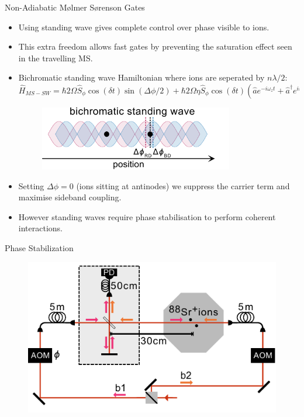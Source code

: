 \documentclass[final]{beamer}
\begin{document}
\begin{frame}{}
\begin{center}
\begin{columns}[t]
\begin{column}{0.49\textwidth}
\begin{alertblock}{Non-Adiabatic Mølmer Sørenson Gates}

      \begin{itemize}
      \item Using standing wave gives complete control over phase
        visible to ions.
      \item This extra freedom allows fast gates by preventing the
        saturation effect seen in the travelling MS.
      \item Bichromatic standing wave Hamiltonian where ions are
        seperated by $n\lambda/2$:
      \large$$ \hat{H}_{MS-SW} = \hbar 2\Omega \hat{S}_{\phi}\cos{(\delta t)}\sin{(\Delta\phi/2)} + \hbar 2\Omega\eta \hat{S}_\phi\cos{(\delta t)}(\hat{a}e^{-i\omega_zt} + \hat{a}^\dagger e^{i\omega_zt})\cos{(\Delta\phi/2)}$$\normalsize
      \begin{figure}
        \includegraphics[width=0.8\textwidth]{./figs/bichro.pdf}
      \end{figure}
      \item Setting $\Delta\phi = 0$ (ions sitting at antinodes) we
        suppress the carrier term and maximise sideband
        coupling.
      \item However standing waves require phase stabilisation to perform
            coherent interactions.
      \end{itemize}
    \end{alertblock}

    \begin{alertblock}{Phase Stabilization}
      \begin{minipage}{0.47\linewidth}
      \begin{figure}
        \includegraphics[width=1.05\textwidth]{./figs/setup+beams_horizontal_poster.pdf}
      \end{figure}


\end{minipage}
\end{alertblock}
\end{column}
\end{columns}
\end{center}
\end{frame}
\end{document}
